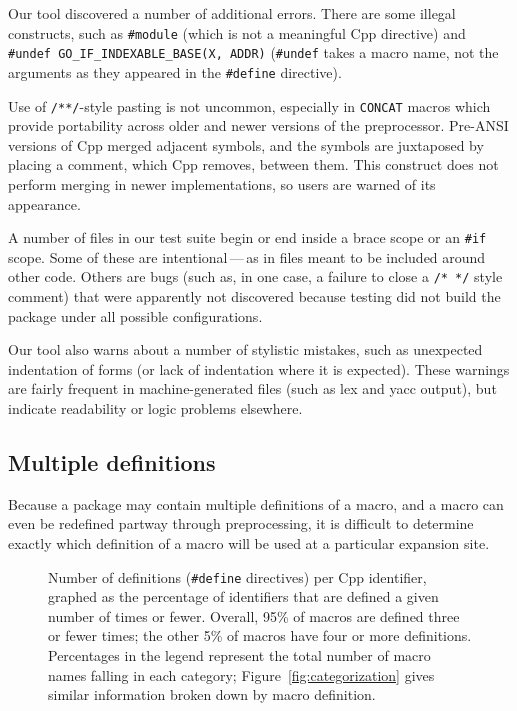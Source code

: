 \documentclass[10pt]{article}
\newcommand{\captionsmall}[1]{\caption[]{\small #1}}
\begin{document}
Our tool discovered a number of additional
errors.  There are some illegal constructs, such as {\tt \#module} (which
is not a meaningful Cpp directive) and {\tt \#undef
\verb|GO_IF_INDEXABLE_BASE|(X, ADDR)} ({\tt \#undef} takes a macro name,
not the arguments as they appeared in the {\tt \#define} directive).
  
Use of {\tt /**/}-style pasting is not uncommon, especially in {\tt CONCAT}
macros which provide portability across older and newer versions of the
preprocessor.  Pre-ANSI versions of Cpp merged adjacent symbols, and the
symbols are juxtaposed by placing a comment, which Cpp removes, between
them.  This construct does not perform merging in newer implementations,
so users are warned of its appearance.

A number of files in our test suite begin or end inside a brace scope or an
{\tt \#if} scope.  Some of these are intentional\,---\,as in files meant
to be included around other code.  Others are bugs (such as, in one case, a
failure to close a {\tt /* */} style comment) that were apparently not
discovered because testing did not build the package under all possible
configurations.

Our tool also warns about a number of stylistic mistakes, such as
unexpected indentation of forms (or lack of indentation where it is
expected).  These warnings are fairly frequent in machine-generated files
(such as lex and yacc output), but indicate readability or logic problems
elsewhere.


\subsection{Multiple definitions}
\label{sec:mult-def}

Because a package may contain multiple definitions of a macro, and a macro
can even be redefined partway through preprocessing, it is difficult to
determine exactly which definition of a macro will be used at a particular
expansion site.

\begin{figure}
\centerline{}
\captionsmall{Number of definitions ({\tt \#define} directives) per Cpp
  identifier, graphed as the percentage of identifiers that are defined a
  given number of times or fewer.  Overall, 95\% of macros are defined
  three or fewer times; the other 5\% of macros have four or more
  definitions.  Percentages in the legend represent the total number of
  macro names falling in each category; Figure~\ref{fig:categorization}
  gives similar information broken down by macro definition.}
\label{fig:freq-def-cat}
\end{figure}
\end{document}
